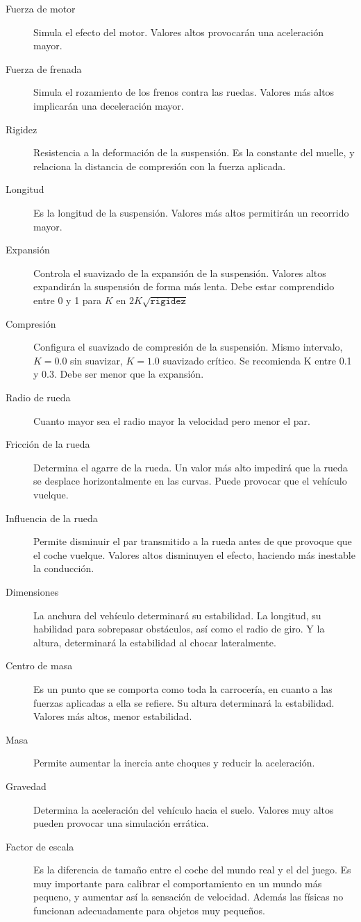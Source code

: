 \documentclass[10pt,a4paper,hidelinks]{article}
\begin{document}
\begin{description}
	\item[Fuerza de motor] Simula el efecto del motor. Valores altos 
	provocarán una aceleración mayor.
	\item[Fuerza de frenada] Simula el rozamiento de los frenos contra las 
	ruedas. Valores más altos implicarán una deceleración mayor.
	\item[Rigidez] Resistencia a la deformación de la suspensión. Es la 
	constante del muelle, y relaciona la distancia de compresión con la 
	fuerza aplicada.
	\item[Longitud] Es la longitud de la suspensión. Valores más altos 
	permitirán un recorrido mayor.
	\item[Expansión] Controla el suavizado de la expansión de la suspensión.  
	Valores altos expandirán la suspensión de forma más lenta.
	Debe estar comprendido entre 0 y 1 para $K$ en 
	$2K\sqrt{\texttt{rigidez}}$
	\item[Compresión] Configura el suavizado de compresión de la suspensión.  
	Mismo intervalo, $K = 0.0$ sin suavizar, $K = 1.0$ suavizado crítico. Se 
	recomienda K entre 0.1 y 0.3. Debe ser menor que la expansión.
	
	\item[Radio de rueda] Cuanto mayor sea el radio mayor la velocidad pero 
	menor el par.
	\item[Fricción de la rueda] Determina el agarre de la rueda. Un valor 
	más alto impedirá que la rueda se desplace horizontalmente en las 
	curvas. Puede provocar que el vehículo vuelque.
	\item[Influencia de la rueda] Permite disminuir el par transmitido a la 
	rueda antes de que provoque que el coche vuelque. Valores altos 
	disminuyen el efecto, haciendo más inestable la conducción.
	\item[Dimensiones] La anchura del vehículo determinará su estabilidad.  
	La longitud, su habilidad para sobrepasar obstáculos, así como el radio 
	de giro. Y la altura, determinará la estabilidad al chocar lateralmente.
	\item[Centro de masa] Es un punto que se comporta como toda la 
	carrocería, en cuanto a las fuerzas aplicadas a ella se refiere. Su 
	altura determinará la estabilidad. Valores más altos, menor estabilidad.
	\item[Masa] Permite aumentar la inercia ante choques y reducir la 
	aceleración.
	\item[Gravedad] Determina la aceleración del vehículo hacia el suelo.  
	Valores muy altos pueden provocar una simulación errática.
	\item[Factor de escala] Es la diferencia de tamaño entre el coche del 
	mundo real y el del juego. Es muy importante para calibrar el 
	comportamiento en un mundo más pequeno, y aumentar así la sensación de 
	velocidad.  Además las físicas no funcionan adecuadamente para objetos 
	muy pequeños.
\end{description}
\end{document}
